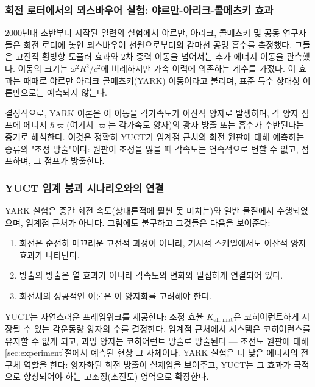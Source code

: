 \documentclass[12pt,a4paper]{article}
\begin{document}
	\subsubsection{회전 로터에서의 뫼스바우어 실험: 야르만-아리크-콜메츠키 효과}
	
	2000년대 초반부터 시작된 일련의 실험에서 야르만, 아리크, 콜메츠키 및 공동 연구자들은 회전 로터에 놓인 뫼스바우어 선원으로부터의 감마선 공명 흡수를 측정했다. 그들은 고전적 횡방향 도플러 효과와 2차 중력 이동을 넘어서는 추가 에너지 이동을 관측했다. 이동의 크기는 \(\omega^2 R^2 / c^2\)에 비례하지만 가속 이력에 의존하는 계수를 가졌다. 이 효과는 때때로 야르만-아리크-콜메츠키(YARK) 이동이라고 불리며, 표준 특수 상대성 이론만으로는 예측되지 않는다.
	
	결정적으로, YARK 이론은 이 이동을 각가속도가 이산적 양자로 발생하며, 각 양자 점프에 에너지 \(\hbar \varpi\)(여기서 \(\varpi\)는 각가속도 양자)의 광자 방출 또는 흡수가 수반된다는 증거로 해석한다. 이것은 정확히 YUCT가 임계점 근처의 회전 원판에 대해 예측하는 종류의 "조정 방출"이다: 원판이 조정을 잃을 때 각속도는 연속적으로 변할 수 없고, 점프하며, 그 점프가 방출한다.
	
	\subsubsection{YUCT 임계 붕괴 시나리오와의 연결}
	
	YARK 실험은 중간 회전 속도(상대론적에 훨씬 못 미치는)와 일반 물질에서 수행되었으며, 임계점 근처가 아니다. 그럼에도 불구하고 그것들은 다음을 보여준다:
	\begin{enumerate}
		\item 회전은 순전히 매끄러운 고전적 과정이 아니라, 거시적 스케일에서도 이산적 양자 효과가 나타난다.
		\item 방출의 방출은 열 효과가 아니라 각속도의 변화와 밀접하게 연결되어 있다.
		\item 회전체의 성공적인 이론은 이 양자화를 고려해야 한다.
	\end{enumerate}
	
	YUCT는 자연스러운 프레임워크를 제공한다: 조정 효율 \(K_{\mathrm{eff,mat}}\)은 코히어런트하게 저장될 수 있는 각운동량 양자의 수를 결정한다. 임계점 근처에서 시스템은 코히어런스를 유지할 수 없게 되고, 과잉 양자는 코히어런트 방출로 방출된다 — 초전도 원판에 대해 \ref{sec:experiment}절에서 예측된 현상 그 자체이다. YARK 실험은 더 낮은 에너지의 전구체 역할을 한다: 양자화된 회전 방출이 실제임을 보여주고, YUCT는 그 효과가 극적으로 향상되어야 하는 고조정(초전도) 영역으로 확장한다.
	
\end{document}
